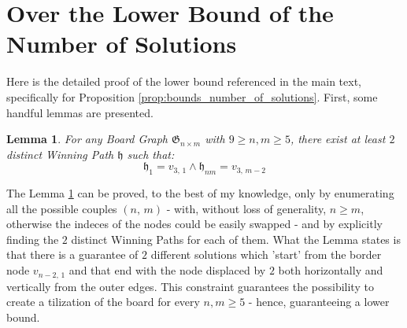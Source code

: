 \documentclass[conference]{IEEEtran}
\newtheorem{lemma}{Lemma}[section]
\begin{document}



\newpage
\appendices
\section{Over the Lower Bound of the Number of Solutions}\label{appendix:proof_lower_bound}
Here is the detailed proof of the lower bound referenced in the main text, specifically for Proposition \ref{prop:bounds_number_of_solutions}.
First, some handful lemmas are presented.

\begin{lemma} \label{lem:two_boards_horizontal}
    For any Board Graph $\mathfrak{G}_{n \times m}$ with $9 \ge n, m \ge 5$, there exist at least $2$ distinct Winning Path $\mathfrak{h}$ such that:
    $$
        \mathfrak{h}_1 = v_{3,\,1} \land \mathfrak{h}_{nm} = v_{3,\,m-2} 
    $$
\end{lemma}

The Lemma \ref{lem:two_boards_horizontal} can be proved, to the best of my knowledge, only by enumerating all the possible couples $(n,\,m)$ - with, without loss of generality, $n \ge m$, otherwise the indeces of the nodes could be easily swapped -
and by explicitly finding the $2$ distinct Winning Paths for each of them.
What the Lemma states is that there is a guarantee of $2$ different solutions which 'start' from the border node $v_{n-2,\,1}$ and that end with the node displaced by $2$ both horizontally and vertically from the outer edges.
This constraint guarantees the possibility to create a tilization of the board for every $n, m \ge 5$ - hence, guaranteeing a lower bound.
\end{document}
